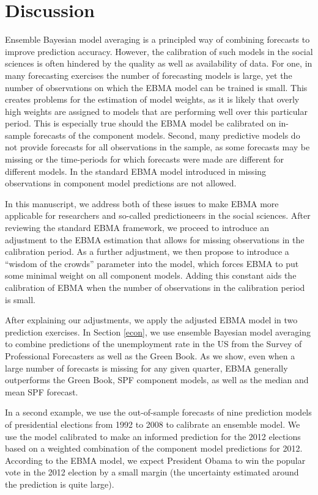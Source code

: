 \documentclass[12pt,fullpage,endnotes]{article}
\begin{document}
\section{Discussion} 

Ensemble Bayesian model averaging is a principled way of combining
forecasts to improve prediction accuracy. However, the calibration of
such models in the social sciences is often hindered by the quality as
well as availability of data. For one, in many forecasting exercises
the number of forecasting models is large, yet the number of
observations on which the EBMA model can be trained is small. This
creates problems for the estimation of model weights, as it is likely
that overly high weights are assigned to models that are performing
well over this particular period. This is especially true should the
EBMA model be calibrated on in-sample forecasts of the component
models. Second, many predictive models do not provide forecasts for
all observations in the sample, as some forecasts may be missing or
the time-periods for which forecasts were made are different for
different models. In the standard EBMA model introduced in
\citet{mhw:2012} missing observations in component model predictions
are not allowed.


In this manuscript, we address both of these issues to make
EBMA more applicable for researchers and so-called predictioneers in the social
sciences. After reviewing the standard EBMA framework, we proceed to
introduce an adjustment to the EBMA estimation that allows for missing
observations in the calibration period. As a further adjustment, we
then propose to introduce a ``wisdom of the crowds'' parameter into
the model, which forces EBMA to put some minimal weight on all
component models. Adding this constant aids the calibration of EBMA
when the number of observations in the calibration period is small.

After explaining our adjustments, we apply the adjusted EBMA model in
two prediction exercises. In Section \ref{econ}, we use ensemble
Bayesian model averaging to combine predictions of the unemployment
rate in the US from the Survey of Professional Forecasters as well as
the Green Book. As we show, even when a large number of forecasts is
missing for any given quarter, EBMA generally outperforms the
Green Book, SPF component models, as well as the median and mean SPF
forecast. 

In a second example, we use the out-of-sample forecasts of nine
prediction models of presidential elections from 1992 to 2008 to
calibrate an ensemble model. We use the model calibrated to make an
informed prediction for the 2012 elections based on a weighted
combination of the component model predictions for 2012. According to
the EBMA model, we expect President Obama to win the popular vote in
the 2012 election by a small margin (the uncertainty estimated around
the prediction is quite large).
\end{document}
